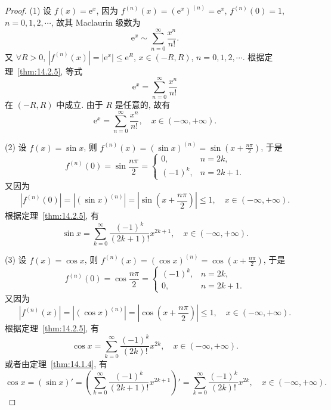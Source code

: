 \begin{proof}
(1) 设 $f(x)=\mathrm{e}^{x}$, 因为 $f^{(n)}(x)=(\mathrm{e}^{x})^{(n)}=\mathrm{e}^{x}$, $f^{(n)}(0)=1$, $n=0,1,2,\cdots$, 故其 Maclaurin 级数为
\[
  \mathrm{e}^{x}\sim\sum_{n=0}^{\infty}\frac{x^{n}}{n!}.
\]
又 $\forall R>0$, $|f^{(n)}(x)|=|\mathrm{e}^{x}|\leqslant\mathrm{e}^{R}$, $x\in(-R,R)$, $n=0,1,2,\cdots$. 根据定理~\ref{thm:14.2.5}, 等式
\[
  \mathrm{e}^{x}=\sum_{n=0}^{\infty}\frac{x^{n}}{n!}
\]
在 $(-R,R)$ 中成立. 由于 $R$ 是任意的, 故有
\[
  \mathrm{e}^{x}=\sum_{n=0}^{\infty}\frac{x^{n}}{n!},\quad x\in(-\infty,+\infty).
\]

(2) 设 $f(x)=\sin x$, 则 $f^{(n)}(x)=(\sin x)^{(n)}=\sin\left(x+\frac{n\pi}{2}\right)$, 于是
\[
  f^{(n)}(0)=\sin\frac{n\pi}{2}=\begin{cases}
    0, & n=2k,\\
    (-1)^{k}, & n=2k+1.
\end{cases}
\]
又因为
\[
  |f^{(n)}(0)|=|(\sin x)^{(n)}|=\left|\sin\left(x+\frac{n\pi}{2}\right)\right|\leqslant1,\quad x\in(-\infty,+\infty).
\]
根据定理~\ref{thm:14.2.5}, 有
\[
  \sin x=\sum_{k=0}^{\infty}\frac{(-1)^{k}}{(2k+1)!}x^{2k+1},\quad x\in(-\infty,+\infty).
\]

(3) 设 $f(x)=\cos x$, 则 $f^{(n)}(x)=(\cos x)^{(n)}=\cos\left(x+\frac{n\pi}{2}\right)$, 于是
\[
  f^{(n)}(0)=\cos\frac{n\pi}{2}=\begin{cases}
    (-1)^{k}, & n=2k,\\
    0, & n=2k+1.
\end{cases}
\]
又因为
\[
  |f^{(n)}(x)|=|(\cos x)^{(n)}|=\left|\cos\left(x+\frac{n\pi}{2}\right)\right|\leqslant1,\quad x\in(-\infty,+\infty).
\]
根据定理~\ref{thm:14.2.5}, 有
\[
  \cos x=\sum_{k=0}^{\infty}\frac{(-1)^{k}}{(2k)!}x^{2k},\quad x\in(-\infty,+\infty).
\]
或者由定理~\ref{thm:14.1.4}, 有
\[
  \cos x=(\sin x)'=\left(\sum_{k=0}^{\infty}\frac{(-1)^{k}}{(2k+1)!}x^{2k+1}\right)'=\sum_{k=0}^{\infty}\frac{(-1)^{k}}{(2k)!}x^{2k},\quad x\in(-\infty,+\infty).
\]


\end{proof}

